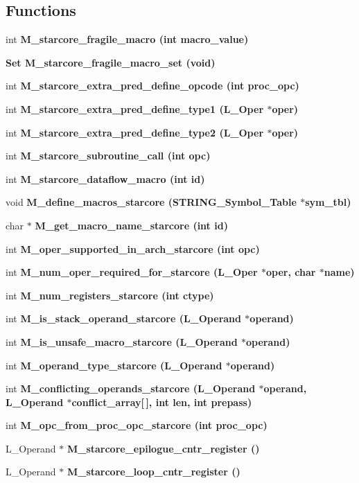 \subsection*{Functions}
\begin{CompactItemize}
\item 
int \bf{M\_\-starcore\_\-fragile\_\-macro} (int macro\_\-value)
\item 
\bf{Set} \bf{M\_\-starcore\_\-fragile\_\-macro\_\-set} (void)
\item 
int \bf{M\_\-starcore\_\-extra\_\-pred\_\-define\_\-opcode} (int proc\_\-opc)
\item 
int \bf{M\_\-starcore\_\-extra\_\-pred\_\-define\_\-type1} (L\_\-Oper $\ast$oper)
\item 
int \bf{M\_\-starcore\_\-extra\_\-pred\_\-define\_\-type2} (L\_\-Oper $\ast$oper)
\item 
int \bf{M\_\-starcore\_\-subroutine\_\-call} (int opc)
\item 
int \bf{M\_\-starcore\_\-dataflow\_\-macro} (int id)
\item 
void \bf{M\_\-define\_\-macros\_\-starcore} (\bf{STRING\_\-Symbol\_\-Table} $\ast$sym\_\-tbl)
\item 
char $\ast$ \bf{M\_\-get\_\-macro\_\-name\_\-starcore} (int id)
\item 
int \bf{M\_\-oper\_\-supported\_\-in\_\-arch\_\-starcore} (int opc)
\item 
int \bf{M\_\-num\_\-oper\_\-required\_\-for\_\-starcore} (L\_\-Oper $\ast$oper, char $\ast$\bf{name})
\item 
int \bf{M\_\-num\_\-registers\_\-starcore} (int ctype)
\item 
int \bf{M\_\-is\_\-stack\_\-operand\_\-starcore} (L\_\-Operand $\ast$operand)
\item 
int \bf{M\_\-is\_\-unsafe\_\-macro\_\-starcore} (L\_\-Operand $\ast$operand)
\item 
int \bf{M\_\-operand\_\-type\_\-starcore} (L\_\-Operand $\ast$operand)
\item 
int \bf{M\_\-conflicting\_\-operands\_\-starcore} (L\_\-Operand $\ast$operand, L\_\-Operand $\ast$conflict\_\-array[$\,$], int len, int prepass)
\item 
int \bf{M\_\-opc\_\-from\_\-proc\_\-opc\_\-starcore} (int proc\_\-opc)
\item 
L\_\-Operand $\ast$ \bf{M\_\-starcore\_\-epilogue\_\-cntr\_\-register} ()
\item 
L\_\-Operand $\ast$ \bf{M\_\-starcore\_\-loop\_\-cntr\_\-register} ()
\item 

\end{CompactItemize}
